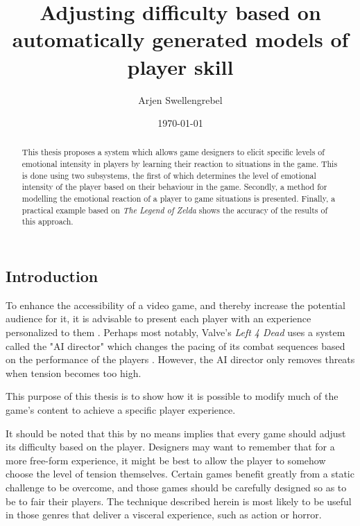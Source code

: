 \documentclass[a4paper]{article}
\title{Adjusting difficulty based on automatically generated models of player skill}
\author{Arjen Swellengrebel}
\date{\today}
\begin{document}
\maketitle

\begin{multicols*}{2}
\begin{abstract}
This thesis proposes a system which allows game designers to elicit specific levels of emotional intensity in players by learning their reaction to situations in the game.
This is done using two subsystems, the first of which determines the level of emotional intensity of the player based on their behaviour in the game.
Secondly, a method for modelling the emotional reaction of a player to game situations is presented.
Finally, a practical example based on \emph{The Legend of Zelda} shows the accuracy of the results of this approach.
\end{abstract}

\section{Introduction}
To enhance the accessibility of a video game, and thereby increase the potential audience for it, it is advisable to present each player with an experience personalized to them \cite{playercentered}. Perhaps most notably, Valve's \emph{Left 4 Dead} uses a system called the "AI director" which changes the pacing of its combat sequences based on the performance of the players \cite{left4dead}. However, the AI director only removes threats when tension becomes too high.

This purpose of this thesis is to show how it is possible to modify much of the game's content to achieve a specific player experience. 


It should be noted that this by no means implies that every game should adjust its difficulty based on the player. Designers may want to remember that for a more free-form experience, it might be best to allow the player to somehow choose the level of tension themselves. Certain games benefit greatly from a static challenge to be overcome, and those games should be carefully designed so as to be to fair their players. The technique described herein is most likely to be useful in those genres that deliver a visceral experience, such as action or horror.


\end{multicols*}
\end{document}
